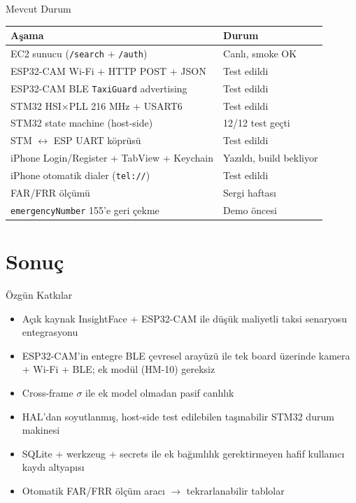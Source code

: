 \documentclass[aspectratio=169,12pt]{beamer}
\begin{document}
\begin{frame}{Mevcut Durum}
    \small
    \begin{tabular}{l l}
    \toprule
    \textbf{Aşama} & \textbf{Durum}\\
    \midrule
    EC2 sunucu (\texttt{/search} + \texttt{/auth})  & \alert{Canlı, smoke OK}\\
    ESP32-CAM Wi-Fi + HTTP POST + JSON              & \alert{Test edildi}\\
    ESP32-CAM BLE \texttt{TaxiGuard} advertising    & \alert{Test edildi}\\
    STM32 HSI$\times$PLL 216 MHz + USART6           & \alert{Test edildi}\\
    STM32 state machine (host-side)                 & \alert{12/12 test geçti}\\
    STM $\leftrightarrow$ ESP UART köprüsü          & \alert{Test edildi}\\
    iPhone Login/Register + TabView + Keychain      & \alert{Yazıldı, build bekliyor}\\
    iPhone otomatik dialer (\texttt{tel://})         & \alert{Test edildi}\\
    \hline
    FAR/FRR ölçümü                                  & Sergi haftası\\
    \texttt{emergencyNumber} 155'e geri çekme       & Demo öncesi\\
    \bottomrule
    \end{tabular}
\end{frame}

\section{Sonuç}

\begin{frame}{Özgün Katkılar}
    \begin{itemize}
        \item Açık kaynak InsightFace + ESP32-CAM ile düşük maliyetli
              taksi senaryosu entegrasyonu
        \item ESP32-CAM'in entegre BLE çevresel arayüzü ile tek board
              üzerinde kamera + Wi-Fi + BLE; ek modül (HM-10) gereksiz
        \item Cross-frame $\sigma$ ile ek model olmadan pasif canlılık
        \item HAL'dan soyutlanmış, host-side test edilebilen taşınabilir
              STM32 durum makinesi
        \item SQLite + werkzeug + secrets ile ek bağımlılık gerektirmeyen
              hafif kullanıcı kaydı altyapısı
        \item Otomatik FAR/FRR ölçüm aracı $\rightarrow$ tekrarlanabilir tablolar
    \end{itemize}
\end{frame}
\end{document}

